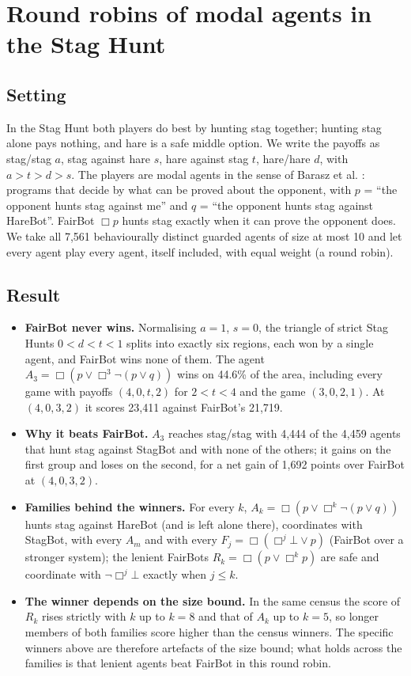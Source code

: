 \documentclass{article}
\begin{document}
\section{Round robins of modal agents in the Stag Hunt}
\label{sec:staghunt-round-robin}

\subsection*{Setting}

In the Stag Hunt both players do best by hunting stag together; hunting stag alone pays nothing,
and hare is a safe middle option. We write the payoffs as stag/stag $a$, stag against hare $s$,
hare against stag $t$, hare/hare $d$, with $a > t > d > s$. The players are modal agents in the
sense of Barasz et al. \cite{barasz2014robust}: programs that decide by what can be proved about the
opponent, with $p$ = ``the opponent hunts stag against me'' and $q$ = ``the opponent hunts stag
against HareBot''. FairBot $\Box p$ hunts stag exactly when it can prove the opponent does. We take
all 7,561 behaviourally distinct guarded agents of size at most 10 and let every agent play every
agent, itself included, with equal weight (a round robin).

\subsection*{Result}

\begin{itemize}
\item \textbf{FairBot never wins.} Normalising $a = 1$, $s = 0$, the triangle of strict Stag Hunts $0 < d < t < 1$ splits into exactly six regions, each won by a single agent, and FairBot wins none of them. The agent $A_3 = \Box(p \vee \Box^3\neg(p \vee q))$ wins on 44.6\% of the area, including every game with payoffs $(4, 0, t, 2)$ for $2 < t < 4$ and the game $(3, 0, 2, 1)$. At $(4, 0, 3, 2)$ it scores 23,411 against FairBot's 21,719.
\item \textbf{Why it beats FairBot.} $A_3$ reaches stag/stag with 4,444 of the 4,459 agents that hunt stag against StagBot and with none of the others; it gains on the first group and loses on the second, for a net gain of 1,692 points over FairBot at $(4, 0, 3, 2)$.
\item \textbf{Families behind the winners.} For every $k$, $A_k = \Box(p \vee \Box^k\neg(p \vee q))$ hunts stag against HareBot (and is left alone there), coordinates with StagBot, with every $A_m$ and with every $F_j = \Box(\Box^j\bot \vee p)$ (FairBot over a stronger system); the lenient FairBots $R_k = \Box(p \vee \Box^k p)$ are safe and coordinate with $\neg\Box^j\bot$ exactly when $j \le k$.
\item \textbf{The winner depends on the size bound.} In the same census the score of $R_k$ rises strictly with $k$ up to $k = 8$ and that of $A_k$ up to $k = 5$, so longer members of both families score higher than the census winners. The specific winners above are therefore artefacts of the size bound; what holds across the families is that lenient agents beat FairBot in this round robin.
\end{itemize}
\end{document}

